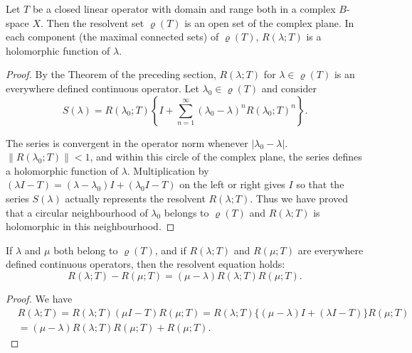 \label{sec:VIII.2}

\begin{theorem}\label{thm:VIII.2.Theorem.1} Let $T$ be a closed linear operator with domain and range both in a complex $B$-space $X$. Then the resolvent set $\varrho(T)$ is an open set of the complex plane. In each component (the maximal connected sets) of $\varrho(T)$, $R(\lambda; T)$ is a holomorphic function of $\lambda$. 
\end{theorem}

\begin{proof}
 By the Theorem of the preceding section, $R(\lambda; T)$ for $\lambda \in \varrho(T)$ is an everywhere defined continuous operator. Let $\lambda_0 \in \varrho(T)$ and consider 
\begin{equation}\label{eq:VIII.2.1}
S (\lambda) = R \left(\lambda_{0}; T\right) \left\{I + \sum\limits_{n=1} ^{\infty} \left(\lambda_{0} - \lambda\right) ^{n} R \left(\lambda_{0}; T\right) ^{n} \right\}. \end{equation}

The series is convergent in the operator norm whenever $\left|\lambda_{0}-\lambda\right|$. $\left\|R\left(\lambda_{0};T\right)\right\|<1$, and within this circle of the complex plane, the series defines a holomorphic function of $\lambda$. Multiplication by $(\lambda I-T)=(\lambda-\lambda_{0})I+(\lambda_{0}I-T)$ on the left or right gives $I$ so that the series $S(\lambda)$ actually represents the resolvent $R(\lambda;T)$. Thus we have proved that a circular neighbourhood of $\lambda_{0}$ belongs to $\varrho(T)$ and $R(\lambda;T)$ is holomorphic in this neighbourhood. 
\end{proof}

\begin{theorem}\label{thm:VIII.2.Theorem.2} If $\lambda$ and $\mu$ both belong to $\varrho(T)$, and if $R(\lambda; T)$ and $R(\mu; T)$ are everywhere defined continuous operators, then the resolvent equation holds: 
\begin{equation}\label{eq:VIII.2.2}
R (\lambda ; T) - R (\mu ; T) = (\mu - \lambda) R (\lambda ; T) R (\mu ; T).
\end{equation}
\end{theorem}

\begin{proof}
 We have 
\[
\begin{aligned}
&R (\lambda ; T)  = R (\lambda ; T) (\mu I - T) R (\mu ; T) = R (\lambda ; T) \{(\mu - \lambda) I + (\lambda I - T) \} R (\mu ; T) \\
&= (\mu - \lambda) R (\lambda ; T) R (\mu ; T) + R (\mu ; T).
\end{aligned}
\]
\end{proof}

